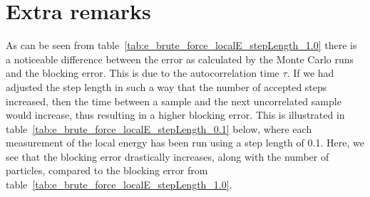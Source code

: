 \documentclass[
    a4paper, aps, twocolumn, floatfix, superscriptaddress,
    nofootinbib]{revtex4-1}
\begin{document}
\section{Extra remarks}\label{sec:extra_remarks}
As can be seen from table~\ref{tab:e_brute_force_localE_stepLength_1.0} there is a noticeable difference between the error as calculated by the Monte Carlo runs and the blocking error. This is due to the autocorrelation time $\tau$. If we had adjusted the step length in such a way that the number of accepted steps increased, then the time between a sample and the next uncorrelated sample would increase, thus resulting in a higher blocking error. This is illustrated in table~\ref{tab:e_brute_force_localE_stepLength_0.1} below, where each measurement of the local energy has been run using a step length of 0.1. Here, we see that the blocking error drastically increases, along with the number of particles, compared to the blocking error from table~\ref{tab:e_brute_force_localE_stepLength_1.0}.
\end{document}
